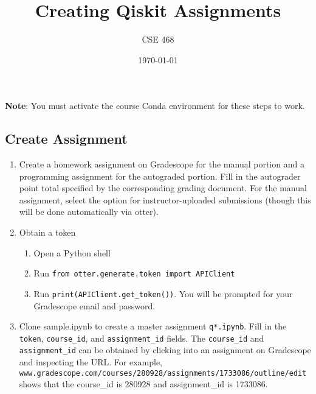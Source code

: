 \documentclass[12pt]{article}
\title{Creating Qiskit Assignments}
\author{CSE 468}
\date{\today}
\begin{document}
\maketitle

\noindent \textbf{Note}: You must activate the course Conda environment for these steps to work.

\subsection*{Create Assignment}
\begin{enumerate}[font=\bfseries]
    \item Create a homework assignment on Gradescope for the manual portion and a programming assignment for the autograded portion. Fill in the autograder point total specified by the corresponding grading document. For the manual assignment, select the option for instructor-uploaded submissions (though this will be done automatically via otter).
    \item Obtain a token
    \begin{enumerate}
        \item Open a Python shell
        \item Run \texttt{from otter.generate.token import APIClient}
        \item Run \texttt{print(APIClient.get\_token())}. You will be prompted for your Gradescope email and password.
    \end{enumerate}
    \item Clone sample.ipynb to create a master assignment \texttt{q*.ipynb}. Fill in the \texttt{token}, \texttt{course\_id}, and \texttt{assignment\_id} fields. The \texttt{course\_id} and \texttt{assignment\_id} can be obtained by clicking into an assignment on Gradescope and inspecting the URL.
    For example,\\ \texttt{www.gradescope.com/courses/280928/assignments/1733086/outline/edit} shows that the course\_id is 280928 and assignment\_id is 1733086.
\end{enumerate}
\newpage
\end{document}
